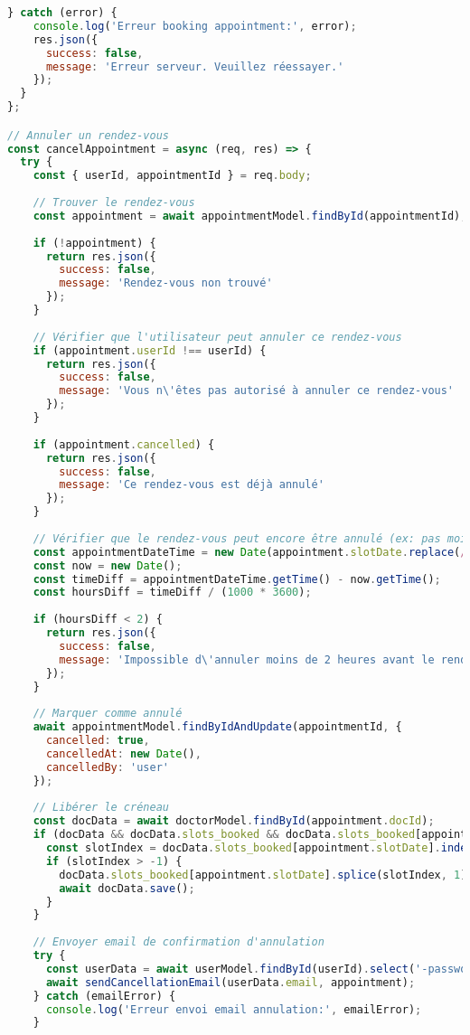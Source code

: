 \begin{lstlisting}[language=JavaScript, caption=appointmentController.js - Gestion complète des rendez-vous]
  } catch (error) {
    console.log('Erreur booking appointment:', error);
    res.json({
      success: false,
      message: 'Erreur serveur. Veuillez réessayer.'
    });
  }
};

// Annuler un rendez-vous
const cancelAppointment = async (req, res) => {
  try {
    const { userId, appointmentId } = req.body;
    
    // Trouver le rendez-vous
    const appointment = await appointmentModel.findById(appointmentId);
    
    if (!appointment) {
      return res.json({
        success: false,
        message: 'Rendez-vous non trouvé'
      });
    }
    
    // Vérifier que l'utilisateur peut annuler ce rendez-vous
    if (appointment.userId !== userId) {
      return res.json({
        success: false,
        message: 'Vous n\'êtes pas autorisé à annuler ce rendez-vous'
      });
    }
    
    if (appointment.cancelled) {
      return res.json({
        success: false,
        message: 'Ce rendez-vous est déjà annulé'
      });
    }
    
    // Vérifier que le rendez-vous peut encore être annulé (ex: pas moins de 2h avant)
    const appointmentDateTime = new Date(appointment.slotDate.replace(/_/g, '/') + ' ' + appointment.slotTime);
    const now = new Date();
    const timeDiff = appointmentDateTime.getTime() - now.getTime();
    const hoursDiff = timeDiff / (1000 * 3600);
    
    if (hoursDiff < 2) {
      return res.json({
        success: false,
        message: 'Impossible d\'annuler moins de 2 heures avant le rendez-vous'
      });
    }
    
    // Marquer comme annulé
    await appointmentModel.findByIdAndUpdate(appointmentId, {
      cancelled: true,
      cancelledAt: new Date(),
      cancelledBy: 'user'
    });
    
    // Libérer le créneau
    const docData = await doctorModel.findById(appointment.docId);
    if (docData && docData.slots_booked && docData.slots_booked[appointment.slotDate]) {
      const slotIndex = docData.slots_booked[appointment.slotDate].indexOf(appointment.slotTime);
      if (slotIndex > -1) {
        docData.slots_booked[appointment.slotDate].splice(slotIndex, 1);
        await docData.save();
      }
    }
    
    // Envoyer email de confirmation d'annulation
    try {
      const userData = await userModel.findById(userId).select('-password');
      await sendCancellationEmail(userData.email, appointment);
    } catch (emailError) {
      console.log('Erreur envoi email annulation:', emailError);
    }
    

\end{lstlisting}
